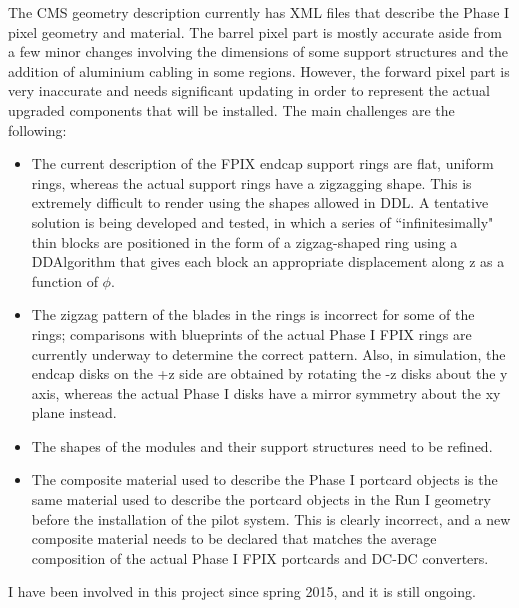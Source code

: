 The CMS geometry description currently has XML files that describe the Phase I pixel geometry and material. The barrel pixel part is mostly accurate aside from a few minor changes involving the dimensions of some support structures and the addition of aluminium cabling in some regions. However, the forward pixel part is very inaccurate and needs significant updating in order to represent the actual upgraded components that will be installed. The main challenges are the following:

\begin{itemize}
\item The current description of the FPIX endcap support rings are flat, uniform rings, whereas the actual support rings have a zigzagging shape. This is extremely difficult to render using the shapes allowed in DDL. A tentative solution is being developed and tested, in which a series of ``infinitesimally" thin blocks are positioned in the form of a zigzag-shaped ring using a DDAlgorithm that gives each block an appropriate displacement along z as a function of $\phi$.
\item The zigzag pattern of the blades in the rings is incorrect for some of the rings; comparisons with blueprints of the actual Phase I FPIX rings are currently underway to determine the correct pattern. Also, in simulation, the endcap disks on the +z side are obtained by rotating the -z disks about the y axis, whereas the actual Phase I disks have a mirror symmetry about the xy plane instead.
\item The shapes of the modules and their support structures need to be refined.
\item The composite material used to describe the Phase I portcard objects is the same material used to describe the portcard objects in the Run I geometry before the installation of the pilot system. This is clearly incorrect, and a new composite material needs to be declared that matches the average composition of the actual Phase I FPIX portcards and DC-DC converters.
\end{itemize}

I have been involved in this project since spring 2015, and it is still ongoing.